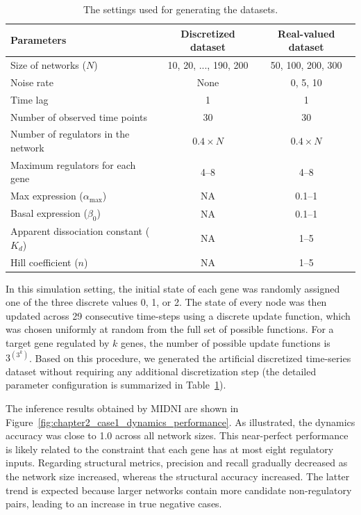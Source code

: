 \begin{table}[htbp]
\centering
\caption{The settings used for generating the datasets.}
\begin{tabular}{lcc}
\hline
\textbf{Parameters} & \textbf{Discretized dataset} & \textbf{Real-valued dataset} \\
\hline
Size of networks ($N$) & 10, 20, ..., 190, 200 & 50, 100, 200, 300 \\
Noise rate & None & 0, 5, 10 \\
Time lag & 1 & 1 \\
Number of observed time points & 30 & 30 \\
Number of regulators in the network & $0.4 \times N$ & $0.4 \times N$ \\
Maximum regulators for each gene & 4--8 & 4--8 \\
Max expression ($\alpha_{\text{max}}$) & NA & 0.1--1 \\
Basal expression ($\beta_0$) & NA & 0.1--1 \\
Apparent dissociation constant ($K_d$) & NA & 1--5 \\
Hill coefficient ($n$) & NA & 1--5 \\
\hline
\end{tabular}
\label{tab:dataset_parameters}
\end{table}
In this simulation setting, the initial state of each gene was randomly assigned one of the three discrete values 0, 1, or 2. The state of every node was then updated across 29 consecutive time-steps using a discrete update function, which was chosen uniformly at random from the full set of possible functions. For a target gene regulated by \( k \) genes, the number of possible update functions is \( 3^{(3^k)} \). Based on this procedure, we generated the artificial discretized time-series dataset without requiring any additional discretization step (the detailed parameter configuration is summarized in Table~\ref{tab:dataset_parameters}).

The inference results obtained by MIDNI are shown in Figure~\ref{fig:chapter2_case1_dynamics_performance}. As illustrated, the dynamics accuracy was close to 1.0 across all network sizes. This near-perfect performance is likely related to the constraint that each gene has at most eight regulatory inputs. Regarding structural metrics, precision and recall gradually decreased as the network size increased, whereas the structural accuracy increased. The latter trend is expected because larger networks contain more candidate non-regulatory pairs, leading to an increase in true negative cases.


